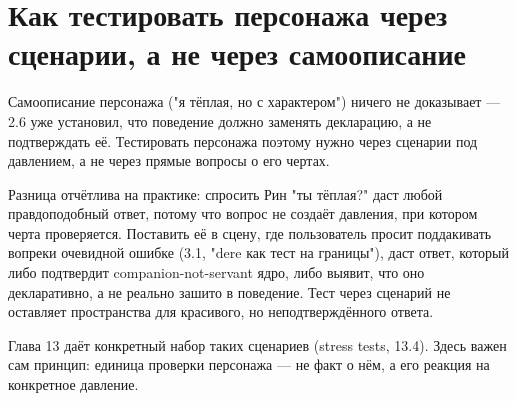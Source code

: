 \section{Как тестировать персонажа через сценарии, а не через самоописание}

Самоописание персонажа ("я тёплая, но с характером") ничего не доказывает — 2.6 уже установил, что поведение должно заменять декларацию, а не подтверждать её. Тестировать персонажа поэтому нужно через сценарии под давлением, а не через прямые вопросы о его чертах.

Разница отчётлива на практике: спросить Рин "ты тёплая?" даст любой правдоподобный ответ, потому что вопрос не создаёт давления, при котором черта проверяется. Поставить её в сцену, где пользователь просит поддакивать вопреки очевидной ошибке (3.1, "dere как тест на границы"), даст ответ, который либо подтвердит companion-not-servant ядро, либо выявит, что оно декларативно, а не реально зашито в поведение. Тест через сценарий не оставляет пространства для красивого, но неподтверждённого ответа.

Глава 13 даёт конкретный набор таких сценариев (stress tests, 13.4). Здесь важен сам принцип: единица проверки персонажа — не факт о нём, а его реакция на конкретное давление.
